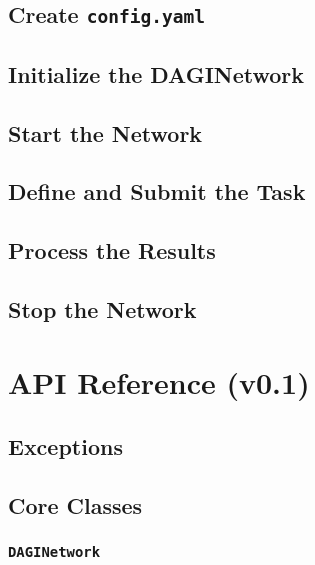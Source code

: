 \documentclass{amsbook}
\theoremstyle{definition}
\theoremstyle{remark}
\numberwithin{equation}{chapter} %
\begin{document}
    \section{Create \texttt{config.yaml}}
    \section{Initialize the DAGINetwork}
    \section{Start the Network}
    \section{Define and Submit the Task}
    \section{Process the Results}
    \section{Stop the Network}

\chapter{API Reference (v0.1)}
    \section{Exceptions}
    \section{Core Classes}
        \subsection{\texttt{DAGINetwork}}
\end{document}
